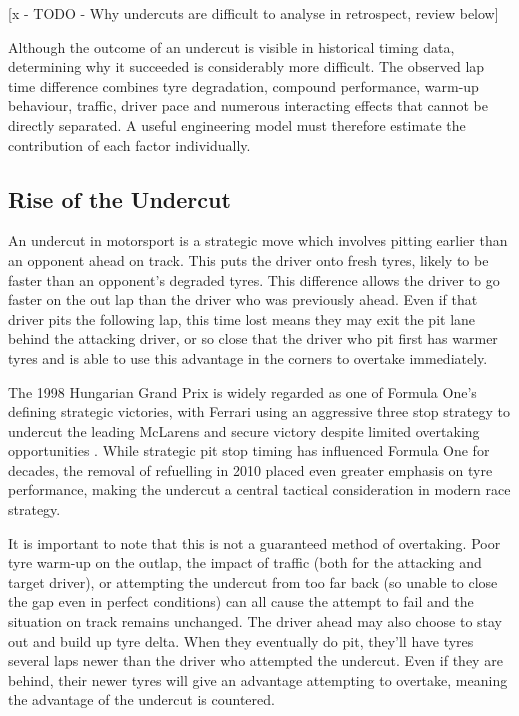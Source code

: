 [x - TODO - Why undercuts are difficult to analyse in retrospect, review below]

Although the outcome of an undercut is visible in historical timing data, determining why it succeeded is considerably more difficult. The observed lap time difference combines tyre degradation, compound performance, warm-up behaviour, traffic, driver pace and numerous interacting effects that cannot be directly separated. A useful engineering model must therefore estimate the contribution of each factor individually.
 
\subsection{Rise of the Undercut}
\label{subsec:rise-undercut}


An undercut in motorsport is a strategic move which involves pitting earlier than an opponent ahead on track. This puts the driver onto fresh tyres, likely to be faster than an opponent's degraded tyres. This difference allows the driver to go faster on the out lap than the driver who was previously ahead. Even if that driver pits the following lap, this time lost means they may exit the pit lane behind the attacking driver, or so close that the driver who pit first has warmer tyres and is able to use this advantage in the corners to overtake immediately. 

The 1998 Hungarian Grand Prix is widely regarded as one of Formula One's defining strategic victories, with Ferrari using an aggressive three stop strategy to undercut the leading McLarens and secure victory despite limited overtaking opportunities \cite{Formula12020Hungary1998}. While strategic pit stop timing has influenced Formula One for decades, the removal of refuelling in 2010 placed even greater emphasis on tyre performance, making the undercut a central tactical consideration in modern race strategy.

It is important to note that this is not a guaranteed method of overtaking. Poor tyre warm-up on the outlap, the impact of traffic (both for the attacking and target driver), or attempting the undercut from too far back (so unable to close the gap even in perfect conditions) can all cause the attempt to fail and the situation on track remains unchanged. The driver ahead may also choose to stay out and build up tyre delta. When they eventually do pit, they'll have tyres several laps newer than the driver who attempted the undercut. Even if they are behind, their newer tyres will give an advantage attempting to overtake, meaning the advantage of the undercut is countered.

